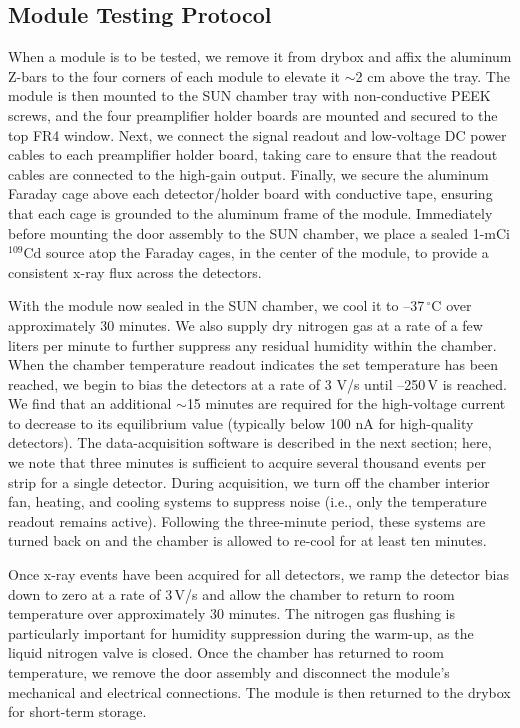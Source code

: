 \documentclass[journal]{IEEEtran}
\begin{document}
\subsection{Module Testing Protocol}
When a module is to be tested, we remove it from drybox and affix the aluminum Z-bars to the four corners of each module to elevate it ${\sim}$2 cm above the tray. The module is then mounted to the SUN chamber tray with non-conductive PEEK screws, and the four preamplifier holder boards are mounted and secured to the top FR4 window. Next, we connect the signal readout and low-voltage DC power cables to each preamplifier holder board, taking care to ensure that the readout cables are connected to the high-gain output. Finally, we secure the aluminum Faraday cage above each detector/holder board with conductive tape, ensuring that each cage is grounded to the aluminum frame of the module. Immediately before mounting the door assembly to the SUN chamber, we place a sealed 1-mCi $^{109}\text{Cd}$ source atop the Faraday cages, in the center of the module, to provide a consistent x-ray flux across the detectors.
%
\par With the module now sealed in the SUN chamber, we cool it to --37$\,^\circ\text{C}$ over approximately 30 minutes. We also supply dry nitrogen gas at a rate of a few liters per minute to further suppress any residual humidity within the chamber. When the chamber temperature readout indicates the set temperature has been reached, we begin to bias the detectors at a rate of 3 V/s until --250\,V is reached. We find that an additional ${\sim}$15 minutes are required for the high-voltage current to decrease to its equilibrium value (typically below 100 nA for high-quality detectors). The data-acquisition software is described in the next section; here, we note that three minutes is sufficient to acquire several thousand events per strip for a single detector. During acquisition, we turn off the chamber interior fan, heating, and cooling systems to suppress noise (i.e., only the temperature readout remains active). Following the three-minute period, these systems are turned back on and the chamber is allowed to re-cool for at least ten minutes.
%
\par Once x-ray events have been acquired for all detectors, we ramp the detector bias down to zero at a rate of 3\,V/s and allow the chamber to return to room temperature over approximately 30 minutes. The nitrogen gas flushing is particularly important for humidity suppression during the warm-up, as the liquid nitrogen valve is closed. Once the chamber has returned to room temperature, we remove the door assembly and disconnect the module's mechanical and electrical connections. The module is then returned to the drybox for short-term storage.
%
\end{document}
